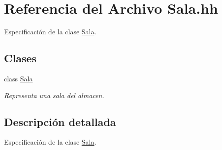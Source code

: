 \hypertarget{_sala_8hh}{}\section{Referencia del Archivo Sala.\+hh}
\label{_sala_8hh}


Especificación de la clase \hyperlink{class_sala}{Sala}.  


\subsection*{Clases}
\begin{DoxyCompactItemize}
\item 
class \hyperlink{class_sala}{Sala}
\begin{DoxyCompactList}\small\item\em Representa una sala del almacen. \end{DoxyCompactList}\end{DoxyCompactItemize}


\subsection{Descripción detallada}
Especificación de la clase \hyperlink{class_sala}{Sala}. 

